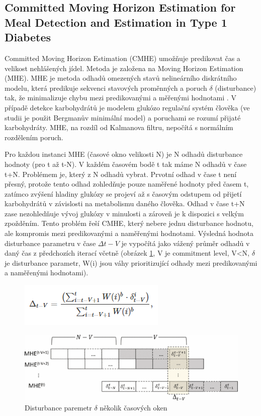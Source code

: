 \subsection{Committed Moving Horizon Estimation for Meal Detection and Estimation in Type 1 Diabetes \citep{Analyza.MovingHorizon}}
\label{ch:horizon}

Committed Moving Horizon Estimation (CMHE) umožňuje predikovat čas a velikost nehlášených jídel. Metoda je založena na Moving Horizon Estimation (MHE). MHE je metoda odhadů omezených stavů nelineárního diskrátního modelu, která predikuje sekvenci stavových proměnných a poruch $\delta$ (disturbance) tak, že minimalizuje chybu mezi predikovanými a měřenými hodnotami \citep{Analyza.MovingHorizon}. V případě detekce karbohydrátů je modelem glukózo regulační systém člověka (ve studii je použit Bergmanův minimální model) a poruchami se rozumí přijaté karbohydráty. MHE, na rozdíl od Kalmanova filtru, nepočítá s normálním rozdělením poruch. 

Pro každou instanci MHE (časové okno velikosti N) je N odhadů disturbance hodnoty (pro t až t-N). V každém časovém bodě t tak máme N odhadů v čase t+N. Problémem je, který z N odhadů vybrat. Prvotní odhad v čase t není přesný, protože tento odhad zohledňuje pouze naměřené hodnoty před časem t, zatímco zvýšení hladiny glukózy se projeví až s časovým odstupem od přijetí karbohydrátů v závislosti na metabolismu daného člověka. Odhad v čase t+N zase nezohledňuje vývoj glukózy v minulosti a zároveň je k dispozici s velkým zpožděním. Tento problém řeší CMHE, který nebere jednu disturbance hodnotu, ale kompromis mezi predikovanými a naměřenými hodnotami. Výsledná hodnota disturbance parametru v čase $\Delta t-V$ je vypočítá jako vážený průměr odhadů v daný čas z předchozích iterací včetně (obrázek \ref{fig:horizon1}, V je commitment level, V<N, $\delta$ je disturbance parametr, W(i) jsou váhy prioritizující odhady mezi predikovanými a naměřenými hodnotami).

\begin{figure}[H]
\includegraphics{img/analyza/horizon2.png}
\end{figure}

\begin{figure}[H]
\caption{Disturbance paremetr $\delta$ několik časových oken}
\label{fig:horizon1}
\centering
\includegraphics[width=1\textwidth]{img/analyza/horizon1.png}
\end{figure}

